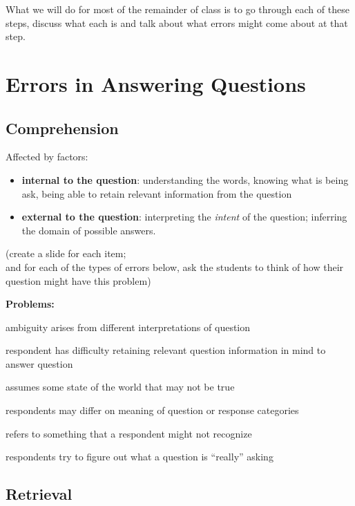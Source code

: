 \documentclass[11pt]{lecturenotes}
\begin{document}
What we will do for most of the remainder of class is to go through each of these steps, discuss what each is and talk about what errors might come about at that step. 

\section{Errors in Answering Questions}
\subsection[15]{Comprehension}
\slide
{}

Affected by factors: 
\begin{itemize}
\item \textbf{internal to the question}: understanding the words, knowing what is being ask, being able to retain relevant information from the question
\item \textbf{external to the question}: interpreting the \emph{intent} of the question; inferring the domain of possible answers. 
\end{itemize}

\slide
(create a slide for each item;\\ and for each of the types of errors below, ask the students to think of how their question might have this problem)

\textbf{Problems:}
\begin{description}[topsep=-1em]
\item[Grammar] ambiguity arises from different interpretations of question
\item[Excessive complexity] respondent has difficulty retaining relevant question information in mind to answer question
\item[Faulty presupposition] assumes some state of the world that may not be true
\item[Vague concepts or quantifiers] respondents may differ on meaning of question or response categories
\item[Unfamiliar terms] refers to something that a respondent might not recognize
\item[False inference] respondents try to figure out what a question is ``really'' asking
\end{description}

\subsection[25]{Retrieval}
\slide
{}
\end{document}
